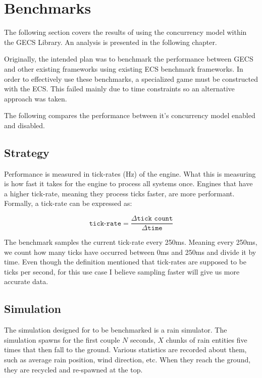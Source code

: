 \section{Benchmarks}
The following section covers the results of using the concurrency model within the GECS Library. An analysis is presented in the following chapter.

Originally, the intended plan was to benchmark the performance between GECS and other existing frameworks using existing ECS benchmark frameworks. In order to effectively use these benchmarks, a specialized game must be constructed with the ECS. This failed mainly due to time constraints so an alternative approach was taken. 

The following compares the performance between it's concurrency model enabled and disabled. 

\subsection{Strategy}
Performance is measured in tick-rates (Hz) of the engine. What this is measuring is how fast it takes for the engine to process all systems once. Engines that have a higher tick-rate, meaning they process ticks faster, are more performant. Formally, a tick-rate can be expressed as:

$$
\texttt{tick-rate} = \frac{\Delta\texttt{tick count}}{\Delta\texttt{time}}
$$

The benchmark samples the current tick-rate every 250ms. Meaning every 250ms, we count how many ticks have occurred between 0ms and 250ms and divide it by time. Even though the definition mentioned that tick-rates are supposed to be ticks per second, for this use case I believe sampling faster will give us more accurate data. 

\subsection{Simulation}
The simulation designed for to be benchmarked is a rain simulator. The simulation spawns for the first couple $N$ seconds, $X$ chunks of rain entities five times that then fall to the ground. Various statistics are recorded about them, such as average rain position, wind direction, etc. When they reach the ground, they are recycled and re-spawned at the top.

